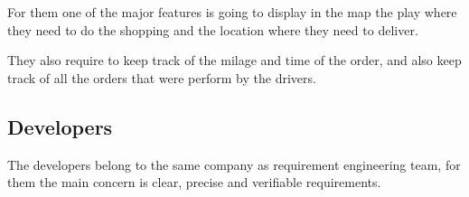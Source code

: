 \noindent For them one of the major features is going to display in the map 
the play where they need to do the shopping and the location where they need 
to deliver. \newline

\noindent They also require to keep track of the milage and time of the order, 
and also keep track of all the orders that were perform by the drivers.

\subsection{Developers}
The developers belong to the same company as requirement engineering team, for 
them the main concern is clear, precise and verifiable requirements.